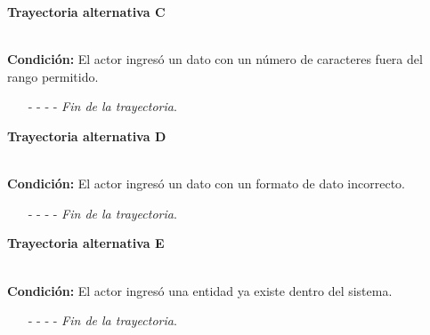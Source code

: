 \hypertarget{CU7-2:TAC}{\textbf{Trayectoria alternativa C}}\\
\noindent \textbf{Condición:} El actor ingresó un dato con un número de caracteres fuera del rango permitido.
\begin{enumerate}
	\UCpaso[\UCsist] Muestra el mensaje  señalando el campo que presenta el error en la pantalla .
	\UCpaso Regresa al paso \ref{CU7.2-P5} de la trayectoria principal.
	\item[- -] - - {\em {Fin de la trayectoria}}.%
\end{enumerate}
\hypertarget{CU7-2:TAD}{\textbf{Trayectoria alternativa D}}\\
\noindent \textbf{Condición:} El actor ingresó un dato con un formato de dato incorrecto.
\begin{enumerate}
	\UCpaso[\UCsist] Muestra el mensaje  señalando el campo que presenta el error en la pantalla .
	\UCpaso Regresa al paso \ref{CU7.2-P5} de la trayectoria principal.
	\item[- -] - - {\em {Fin de la trayectoria}}.
\end{enumerate}
\hypertarget{CU7-2:TAE}{\textbf{Trayectoria alternativa E}}\\
\noindent \textbf{Condición:} El actor ingresó una entidad ya existe dentro del sistema.
\begin{enumerate}
	\UCpaso[\UCsist] Muestra el mensaje  señalando el campo que presenta la duplicidad en la pantalla .
	\UCpaso Regresa al paso \ref{CU7.2-P5} de la trayectoria principal.
	\item[- -] - - {\em {Fin de la trayectoria}}.
\end{enumerate}